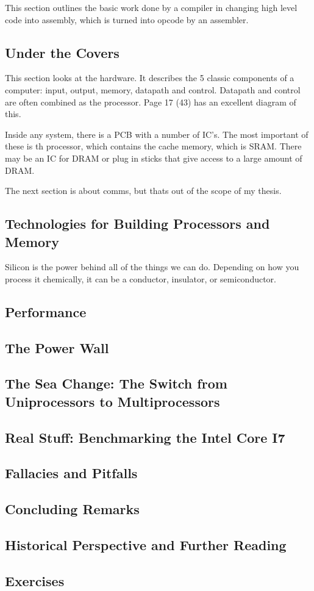 \documentclass{article}
\begin{document}
			This section outlines the basic work done by a compiler in changing high level code into assembly, which is turned into opcode by an assembler.
		\subsection{Under the Covers}
			This section looks at the hardware. It describes the 5 classic components of a computer: input, output, memory, datapath and control. Datapath and control are often combined as the processor. Page 17 (43) has an excellent diagram of this.
			
			Inside any system, there is a PCB with a number of IC's. The most important of these is th processor, which contains the cache memory, which is SRAM. There may be an IC for DRAM or plug in sticks that give access to a large amount of DRAM.
			
			The next section is about comms, but thats out of the scope of my thesis.
		\subsection{Technologies for Building Processors and Memory}
			Silicon is the power behind all of the things we can do. Depending on how you process it chemically, it can be a conductor, insulator, or semiconductor.
		\subsection{Performance}
		
		\subsection{The Power Wall}
		
		\subsection{The Sea Change: The Switch from Uniprocessors to Multiprocessors}
		
		\subsection{Real Stuff: Benchmarking the Intel Core I7}
		
		\subsection{Fallacies and Pitfalls}
		
		\subsection{Concluding Remarks}
		
		\subsection{Historical Perspective and Further Reading}
		
		\subsection{Exercises}
\end{document}
